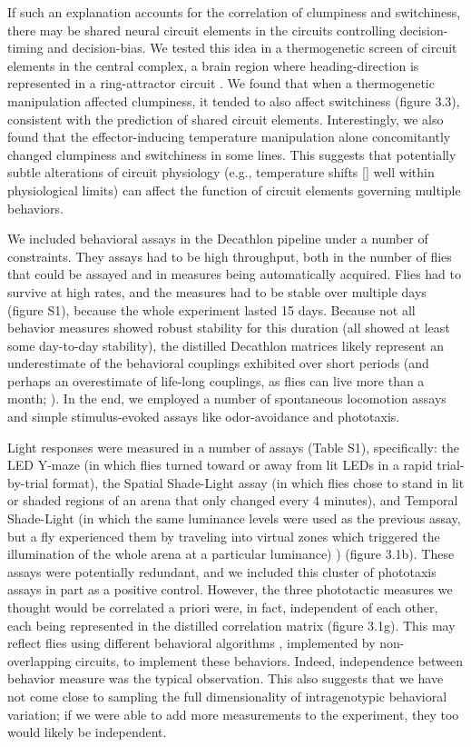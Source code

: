 \documentclass[12pt,letterpaper]{article}
\begin{document}
If such an explanation accounts for the correlation of clumpiness and switchiness, there may be shared neural circuit elements in the circuits controlling decision-timing and decision-bias. We tested this idea in a thermogenetic screen of circuit elements in the central complex, a brain region where heading-direction is represented \cite{Seelig_Neural_2015} in a ring-attractor circuit \cite{Kakaria_Ring_2017}. We found that when a thermogenetic manipulation affected clumpiness, it tended to also affect switchiness (figure 3.3), consistent with the prediction of shared circuit elements. Interestingly, we also found that the effector-inducing temperature manipulation alone concomitantly changed clumpiness and switchiness in some lines. This suggests that potentially subtle alterations of circuit physiology (e.g., temperature shifts [\cite{Haddad_Circuit_2018}] well within physiological limits) can affect the function of circuit elements governing multiple behaviors. 

We included behavioral assays in the Decathlon pipeline under a number of constraints. They assays had to be high throughput, both in the number of flies that could be assayed and in measures being automatically acquired. Flies had to survive at high rates, and the measures had to be stable over multiple days (figure S1), because the whole experiment lasted 15 days. Because not all behavior measures showed robust stability for this duration (all showed at least some day-to-day stability), the distilled Decathlon matrices likely represent an underestimate of the behavioral couplings exhibited over short periods (and perhaps an overestimate of life-long couplings, as flies can live more than a month; \cite{Linford_Measurement_2013}). In the end, we employed a number of spontaneous locomotion assays and simple stimulus-evoked assays like odor-avoidance and phototaxis. 

Light responses were measured in a number of assays (Table S1), specifically: the LED Y-maze \cite{Werkhoven_MARGO_2019} (in which flies turned toward or away from lit LEDs in a rapid trial-by-trial format), the Spatial Shade-Light assay (in which flies chose to stand in lit or shaded regions of an arena that only changed every 4 minutes), and Temporal Shade-Light (in which the same luminance levels were used as the previous assay, but a fly experienced them by traveling into virtual zones which triggered the illumination of the whole arena at a particular luminance) ) (figure 3.1b). These assays were potentially redundant, and we included this cluster of phototaxis assays in part as a positive control. However, the three phototactic measures we thought would be correlated a priori were, in fact, independent of each other, each being represented in the distilled correlation matrix (figure 3.1g). This may reflect flies using different behavioral algorithms \cite{Krakauer_Neuroscience_2017}, implemented by non-overlapping circuits, to implement these behaviors. Indeed, independence between behavior measure was the typical observation. This also suggests that we have not come close to sampling the full dimensionality of intragenotypic behavioral variation; if we were able to add more measurements to the experiment, they too would likely be independent.
\end{document}
